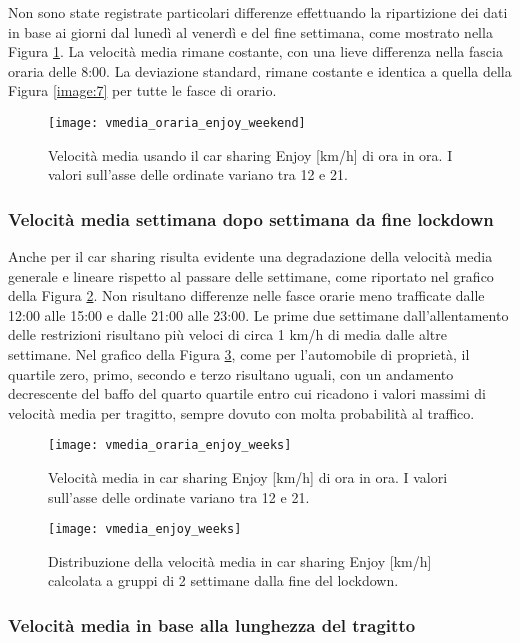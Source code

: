 Non sono state registrate particolari differenze effettuando la ripartizione dei dati in base ai giorni dal lunedì al venerdì e del fine settimana, come mostrato nella Figura \ref{image:20}. La velocità media rimane costante, con una lieve differenza nella fascia oraria delle 8:00. La deviazione standard, rimane costante e identica a quella della Figura \ref{image:7} per tutte le fasce di orario.

\begin{figure}[H]
	\centering
	\texttt{[image: vmedia\_oraria\_enjoy\_weekend]}
	\caption{Velocità media usando il car sharing Enjoy [km/h] di ora in ora. I valori sull'asse delle ordinate variano tra 12 e 21.}
	\label{image:20}
\end{figure}

\subsubsection{Velocità media settimana dopo settimana da fine lockdown}

Anche per il car sharing risulta evidente una degradazione della velocità media generale e lineare rispetto al passare delle settimane, come riportato nel grafico della Figura \ref{image:16}. Non risultano differenze nelle fasce orarie meno trafficate dalle 12:00 alle 15:00 e dalle 21:00 alle 23:00. Le prime due settimane dall'allentamento delle restrizioni risultano più veloci di circa 1 km/h di media dalle altre settimane. Nel grafico della Figura \ref{image:28}, come per l'automobile di proprietà, il quartile zero, primo, secondo e terzo risultano uguali, con un andamento decrescente del baffo del quarto quartile entro cui ricadono i valori massimi di velocità media per tragitto, sempre dovuto con molta probabilità al traffico.

\begin{figure}[H]
	\centering
	\texttt{[image: vmedia\_oraria\_enjoy\_weeks]}
	\caption{Velocità media in car sharing Enjoy [km/h] di ora in ora. I valori sull'asse delle ordinate variano tra 12 e 21.}
	\label{image:16}
\end{figure}

\begin{figure}
	\centering
	\texttt{[image: vmedia\_enjoy\_weeks]}
	\caption{Distribuzione della velocità media in car sharing Enjoy [km/h] calcolata a gruppi di 2 settimane dalla fine del lockdown.}
	\label{image:28}
\end{figure}

\subsubsection{Velocità media in base alla lunghezza del tragitto}

